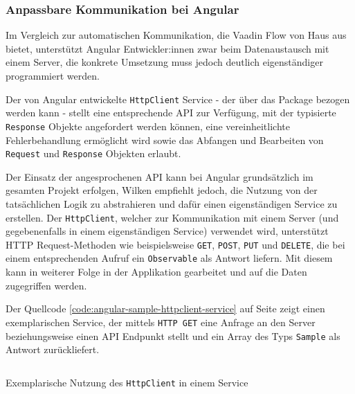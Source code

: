 \documentclass[a4paper,12pt,twoside]{scrreprt}
\begin{document}
\subsubsection{Anpassbare Kommunikation bei Angular}
\label{sub-sub-sec:kommunikation-herangehensweise-angular}
Im Vergleich zur automatischen Kommunikation, die Vaadin Flow von Haus aus bietet, unterstützt Angular Entwickler:innen zwar beim Datenaustausch mit einem Server, die konkrete Umsetzung muss jedoch deutlich eigenständiger programmiert werden.

\medskip

Der von Angular entwickelte \texttt{HttpClient} Service - der über das  Package bezogen werden kann - stellt eine entsprechende API zur Verfügung, mit der typisierte \texttt{Response} Objekte angefordert werden können, eine vereinheitlichte Fehlerbehandlung ermöglicht wird sowie das Abfangen und Bearbeiten von \texttt{Request} und \texttt{Response} Objekten erlaubt. \parencite[][]{google_llc_communicating_nodate}

\medskip

Der Einsatz der angesprochenen API kann bei Angular grundsätzlich im gesamten Projekt erfolgen, Wilken empfiehlt jedoch, die Nutzung von der tatsächlichen Logik zu abstrahieren und dafür einen eigenständigen Service zu erstellen. Der \texttt{HttpClient}, welcher zur Kommunikation mit einem Server (und gegebenenfalls in einem eigenständigen Service) verwendet wird, unterstützt HTTP Request-Methoden wie beispielsweise \texttt{GET}, \texttt{POST}, \texttt{PUT} und \texttt{DELETE}, die bei einem entsprechenden Aufruf ein \texttt{Observable} als Antwort liefern. Mit diesem kann in weiterer Folge in der Applikation gearbeitet und auf die Daten zugegriffen werden. \parencite[][Seite 142-144.]{wilken_angular_2018}

\medskip

Der Quellcode \ref{code:angular-sample-httpclient-service} auf Seite \pageref{code:angular-sample-httpclient-service} zeigt einen exemplarischen Service, der mittels \texttt{HTTP GET} eine Anfrage an den Server beziehungsweise einen API Endpunkt stellt und ein Array des Typs \texttt{Sample} als Antwort zurückliefert.

\begin{listing}[ht]
    \renewcommand{\fcolorbox}[4][]{#4}
    \inputminted[fontsize=\footnotesize,linenos]{js}{code/Luidold_HttpClient-Service.ts}
    \caption[Exemplarische Nutzung des \texttt{HttpClient} in einem Service]{Exemplarische Nutzung des \texttt{HttpClient} in einem Service}
    \label{code:angular-sample-httpclient-service}
\end{listing}
\end{document}
